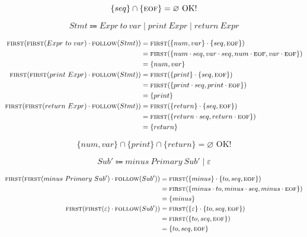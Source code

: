 \documentclass{report}
\newcommand{\Empty}{\varnothing}
\newcommand{\Null}{\varepsilon}
\newcommand{\Seq}{\cdot}
\newcommand{\Spc}{\ }
\newcommand{\Union}{\mathrel{|}}
\newcommand{\FIRST}{\textsc{first}}
\newcommand{\FOLLOW}{\textsc{follow}}
\newcommand{\EOF}{\textsc{eof}}
\newcommand{\Arrow}{\Coloneq}
\newcommand{\NT}[1]{{#1}}
\newcommand{\T}[1]{{#1}}
\begin{document}
\begin{equation*}
  \{\T{seq}\} \cap \{\EOF\} = \Empty \text{ OK!}
\end{equation*}

\begin{equation*}
    \NT{Stmt} \Arrow \NT{Expr} \Spc \T{to} \Spc \T{var} \Union \T{print} \Spc \NT{Expr} \Union \NT{return} \Spc \NT{Expr}
\end{equation*}

\begin{equation*}
  \begin{aligned}
    \FIRST(\FIRST(\NT{Expr} \Spc \T{to} \Spc \T{var}) \Seq \FOLLOW(\NT{Stmt})) &= \FIRST(\{\T{num}, \T{var}\} \Seq \{\T{seq}, \EOF\})\\
    &= \FIRST(\{\T{num} \Seq \T{seq}, \T{var} \Seq \T{seq}, \T{num} \Seq \EOF, \T{var} \Seq \EOF \})\\
    &= \{\T{num}, \T{var}\}\\
    \FIRST(\FIRST(\T{print} \Spc \NT{Expr}) \Seq \FOLLOW(\NT{Stmt})) &= \FIRST(\{\T{print}\} \Seq \{\T{seq}, \EOF\})\\
    &= \FIRST(\{\T{print} \Seq \T{seq}, \T{print} \Seq \EOF\})\\
    &= \{\T{print}\}\\
    \FIRST(\FIRST(\NT{return} \Spc \NT{Expr}) \Seq \FOLLOW(\NT{Stmt})) &= \FIRST(\{\T{return}\} \Seq \{\T{seq}, \EOF\})\\
    &= \FIRST(\{\T{return} \Seq \T{seq}, \T{return} \Seq \EOF\})\\
    &= \{\T{return}\}\\
  \end{aligned}
\end{equation*}

\begin{equation*}
  \{\T{num}, \T{var}\} \cap \{\T{print}\} \cap \{\T{return}\} = \Empty \text{ OK!}
\end{equation*}

\begin{equation*}
    \NT{Sub'} \Arrow \T{minus} \Spc \NT{Primary} \Spc \NT{Sub'} \Union \Null
\end{equation*}

\begin{equation*}
  \begin{aligned}
    \FIRST(\FIRST(\T{minus} \Spc \NT{Primary} \Spc \NT{Sub'}) \Seq \FOLLOW(\NT{Sub'})) &= \FIRST(\{\T{minus}\} \Seq \{\T{to}, \T{seq}, \EOF\})\\
    &= \FIRST(\{\T{minus} \Seq \T{to}, \T{minus} \Seq \T{seq}, \T{minus} \Seq \EOF\})\\
    &= \{\T{minus}\}\\
    \FIRST(\FIRST(\Null) \Seq \FOLLOW(\NT{Sub'})) &= \FIRST(\{\Null\} \Seq \{\T{to}, \T{seq}, \EOF\})\\
    &= \FIRST(\{\T{to}, \T{seq}, \EOF\})\\
    &= \{\T{to}, \T{seq}, \EOF\}
  \end{aligned}
\end{equation*}
\end{document}
